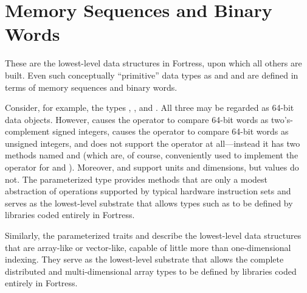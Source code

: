 %
%
%
%

\chapter{Memory Sequences and Binary Words}

These are the lowest-level data structures in Fortress, upon which
all others are built.  Even such conceptually ``primitive'' data
types as  and  and 
are defined in terms of memory sequences and binary words.

Consider, for example, the types ,
, and .  All three may be regarded
as 64-bit data objects.  However,  causes the operator
\EXP{<} to compare 64-bit words as two's-complement signed integers,
 causes the operator \EXP{<}
to compare 64-bit words as unsigned integers,
and  does not support
the operator \EXP{<} at all---instead it has two methods named 
and  (which are, of course, conveniently used to implement the
operator \EXP{<} for  and ).
Moreover,  and  support units and dimensions,
but  values do not.  The parameterized type  provides methods that are
only a modest abstraction of operations supported by typical hardware instruction sets
and serves as the lowest-level substrate that allows types such as 
to be defined by libraries coded entirely in Fortress.

Similarly, the parameterized traits  and 
describe the lowest-level data structures that are array-like or vector-like,
capable of little more than one-dimensional indexing.  They serve as the
lowest-level substrate that allows the complete distributed and multi-dimensional
array types to be defined by libraries coded entirely in Fortress.

